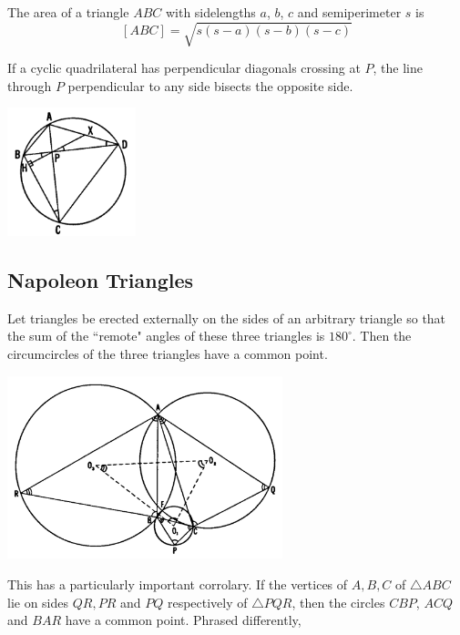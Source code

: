 \documentclass[DIV=12, a4]{scrartcl}
\begin{document}
\begin{corollary}
	The area of a triangle $ABC$ with sidelengths $a$, $b$, $c$ and semiperimeter $s$ is
	$$
	[ABC] = \sqrt{s(s - a)(s - b)(s - c)}
	$$
\end{corollary}

\begin{theorem}
	If a cyclic quadrilateral has perpendicular diagonals crossing at $P$, the line through $P$ perpendicular to any side bisects the opposite side.
\end{theorem}

 \begin{center}
		\includegraphics[width=0.28\textwidth]{media/3-2C}
\end{center}

\subsection{Napoleon Triangles}

\begin{theorem}
Let triangles be erected externally on the sides of an arbitrary triangle so that the sum of the ``remote" angles of these three triangles is $180^{\circ}$. Then the circumcircles of the three triangles have a common point.
\end{theorem}

 \begin{center}
		\includegraphics[width=0.6\textwidth]{media/3-3A}
\end{center}

This has a particularly important corrolary. If the vertices of $A, B, C$ of $\triangle ABC$ lie on sides $QR, PR$ and $PQ$ respectively of $\triangle PQR$, then the circles $CBP$, $ACQ$ and $BAR$ have a common point.
Phrased differently, 
\end{document}
